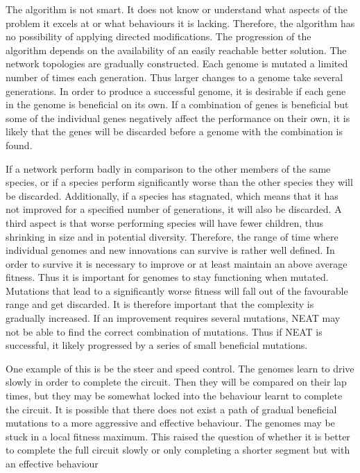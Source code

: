 The algorithm is not smart. It does not know or understand what aspects of the problem it excels at or what behaviours it is lacking. Therefore, the algorithm has no possibility of applying directed modifications. The progression of the algorithm depends on the availability of an easily reachable better solution. The network topologies are gradually constructed. Each genome is mutated a limited number of times each generation. Thus larger changes to a genome take several generations. In order to produce a successful genome, it is desirable if each gene in the genome is beneficial on its own. If a combination of genes is beneficial but some of the individual genes negatively affect the performance on their own, it is likely that the genes will be discarded before a genome with the combination is found.

If a network perform badly in comparison to the other members of the same species, or if a species perform significantly worse than the other species they will be discarded\cite{stanley:neat}. Additionally, if a species has stagnated, which means that it has not improved for a specified number of generations, it will also be discarded. A third aspect is that worse performing species will have fewer children, thus shrinking in size and in potential diversity. Therefore, the range of time where individual genomes and new innovations can survive is rather well defined. In order to survive it is necessary to improve or at least maintain an above average fitness. Thus it is important for genomes to stay functioning when mutated. Mutations that lead to a significantly worse fitness will fall out of the favourable range and get discarded. It is therefore important that the complexity is gradually increased. If an improvement requires several mutations, NEAT may not be able to find the correct combination of mutations. Thus if NEAT is successful, it likely progressed by a series of small beneficial mutations. 

One example of this is be the steer and speed control. The genomes learn to drive slowly in order to complete the circuit. Then they will be compared on their lap times, but they may be somewhat locked into the behaviour learnt to complete the circuit. It is possible that there does not exist a path of gradual beneficial mutations to a more aggressive and effective behaviour. The genomes may be stuck in a local fitness maximum. This raised the question of whether it is better to complete the full circuit slowly or only completing a shorter segment but with an effective behaviour

